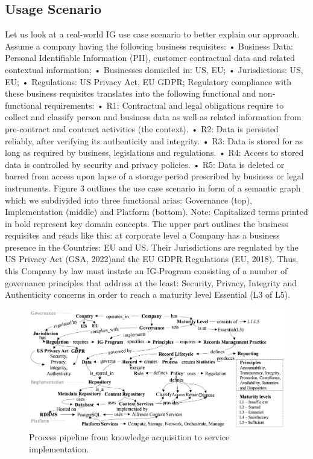 \subsection{Usage Scenario}
Let us look at a real-world IG use case scenario to better explain our approach. Assume a company having the following business requisites: 
•	Business Data: Personal Identifiable Information (PII), customer contractual data and related contextual information; 
•	Businesses domiciled in: US, EU; 
•	Jurisdictions: US, EU; 
•	Regulations: US Privacy Act, EU GDPR; 
Regulatory compliance with these business requisites translates into the following functional and non-functional requirements:
•	R1: Contractual and legal obligations require to collect and classify person and business data as well as related information from pre-contract and contract activities (the context). 
•	 R2: Data is persisted reliably, after verifying its authenticity and integrity. 
•	R3: Data is stored for as long as required by business, legislations and regulations. 
•	R4: Access to stored data is controlled by security and privacy policies. 
•	R5: Data is deleted or barred from access upon lapse of a storage period prescribed by business or legal instruments. 
Figure 3 outlines the use case scenario in form of a semantic graph which we subdivided into three functional arias: Governance (top), Implementation (middle) and Platform (bottom). Note: Capitalized terms printed in bold represent key domain concepts. 
The upper part outlines the business requisites and reads like this: at corporate level a Company has a business presence in the Countries: EU and US. Their Jurisdictions are regulated by the US Privacy Act (GSA, 2022)and the EU GDPR Regulations (EU, 2018). Thus, this Company by law must instate an IG-Program consisting of a number of governance principles that address at the least: Security, Privacy, Integrity and Authenticity concerns in order to reach a maturity level Essential (L3 of L5).
%
\begin{figure}[!hbtp]
  \centering
   \includegraphics[width=\textwidth]{images/Fig3-IG.Scenario.png}
    \caption{Process pipeline from knowledge acquisition to service implementation.}
  \label{fig:igscenario}
\end{figure}
